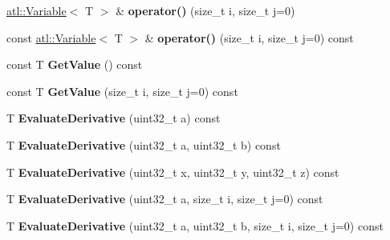 \begin{DoxyCompactItemize}
\item 
\hypertarget{structatl_1_1_variable_matrix_a949002e9718e5c89afa7566a92d92103}{\hyperlink{structatl_1_1_variable}{atl\+::\+Variable}$<$ T $>$ \& {\bfseries operator()} (size\+\_\+t i, size\+\_\+t j=0)}\label{structatl_1_1_variable_matrix_a949002e9718e5c89afa7566a92d92103}

\item 
\hypertarget{structatl_1_1_variable_matrix_a6d873cfa56fe801abb7a53b22d36f081}{const \hyperlink{structatl_1_1_variable}{atl\+::\+Variable}$<$ T $>$ \& {\bfseries operator()} (size\+\_\+t i, size\+\_\+t j=0) const }\label{structatl_1_1_variable_matrix_a6d873cfa56fe801abb7a53b22d36f081}

\item 
\hypertarget{structatl_1_1_variable_matrix_ad94d8c617309904428255343e7c0ba3e}{const T {\bfseries Get\+Value} () const }\label{structatl_1_1_variable_matrix_ad94d8c617309904428255343e7c0ba3e}

\item 
\hypertarget{structatl_1_1_variable_matrix_aadaa361a31a643b56c16dcaf912a4b45}{const T {\bfseries Get\+Value} (size\+\_\+t i, size\+\_\+t j=0) const }\label{structatl_1_1_variable_matrix_aadaa361a31a643b56c16dcaf912a4b45}

\item 
\hypertarget{structatl_1_1_variable_matrix_ad6587a3521473952b5034c189656fc89}{T {\bfseries Evaluate\+Derivative} (uint32\+\_\+t a) const }\label{structatl_1_1_variable_matrix_ad6587a3521473952b5034c189656fc89}

\item 
\hypertarget{structatl_1_1_variable_matrix_ad30a3eb8147e9c685e6f1d4c2c128e77}{T {\bfseries Evaluate\+Derivative} (uint32\+\_\+t a, uint32\+\_\+t b) const }\label{structatl_1_1_variable_matrix_ad30a3eb8147e9c685e6f1d4c2c128e77}

\item 
\hypertarget{structatl_1_1_variable_matrix_aa149ea3e1fd7dcfb90f41e6e3f847eb5}{T {\bfseries Evaluate\+Derivative} (uint32\+\_\+t x, uint32\+\_\+t y, uint32\+\_\+t z) const }\label{structatl_1_1_variable_matrix_aa149ea3e1fd7dcfb90f41e6e3f847eb5}

\item 
\hypertarget{structatl_1_1_variable_matrix_ab7747464b84e1c5e49642d19dadeda20}{T {\bfseries Evaluate\+Derivative} (uint32\+\_\+t a, size\+\_\+t i, size\+\_\+t j=0) const }\label{structatl_1_1_variable_matrix_ab7747464b84e1c5e49642d19dadeda20}

\item 
\hypertarget{structatl_1_1_variable_matrix_a1744bf3e4399c21f380de713fb5481da}{T {\bfseries Evaluate\+Derivative} (uint32\+\_\+t a, uint32\+\_\+t b, size\+\_\+t i, size\+\_\+t j=0) const }\label{structatl_1_1_variable_matrix_a1744bf3e4399c21f380de713fb5481da}


\end{DoxyCompactItemize}
